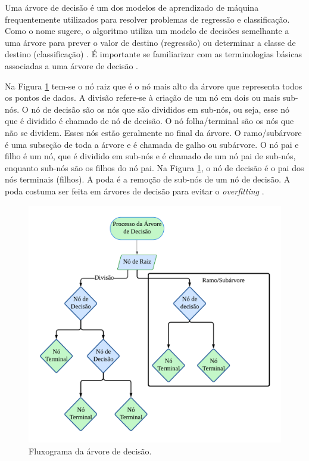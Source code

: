  Uma árvore de decisão é um dos modelos de aprendizado de máquina frequentemente utilizados para resolver problemas de regressão e classificação. Como o nome sugere, o algoritmo utiliza um modelo de decisões semelhante a uma árvore para prever o valor de destino (regressão) ou determinar a classe de destino (classificação) \cite{SHI2023110022}. É importante se familiarizar com as terminologias básicas associadas a uma árvore de decisão \cite{SINGHKUSHWAH20223571}.
 
 Na Figura \ref{fig:decison} tem-se o nó raiz que é o nó mais alto da árvore que representa todos os pontos de dados. A divisão refere-se à criação de um nó em dois ou mais sub-nós.
 O nó de decisão são os nós que são divididos em sub-nós, ou seja, esse nó que é dividido é chamado de nó de decisão. O nó folha/terminal são os nós que não se dividem. Esses nós estão geralmente no final da árvore. O ramo/subárvore é uma subseção de toda a árvore e é chamada de galho ou subárvore. O nó pai e filho é um nó, que é dividido em sub-nós e é chamado de um nó pai de sub-nós, enquanto sub-nós são os filhos do nó pai. Na Figura \ref{fig:decison}, o nó de decisão é o pai dos nós terminais (filhos).
 A poda é a remoção de sub-nós de um nó de decisão. A poda costuma ser feita em árvores de decisão para evitar o \textit{overfitting}  \cite{decision}.
 
 \begin{figure}[H]
 	\centering
 	\caption{Fluxograma da árvore de decisão.}
 	\label{fig:decison}
 	\includegraphics[width=0.7\linewidth]{Modelos/Figuras/decison.pdf}
 	
 \end{figure}
  
